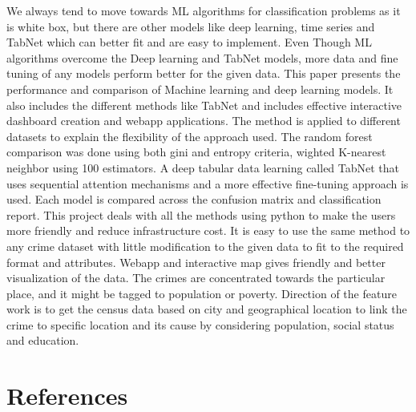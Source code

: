 \documentclass[11 pt,conference,final,]{IEEEtran}
\begin{document}
We always tend to move towards ML algorithms for classification problems
as it is white box, but there are other models like deep learning, time
series and TabNet which can better fit and are easy to implement. Even
Though ML algorithms overcome the Deep learning and TabNet models, more
data and fine tuning of any models perform better for the given data.
This paper presents the performance and comparison of Machine learning
and deep learning models. It also includes the different methods like
TabNet and includes effective interactive dashboard creation and webapp
applications. The method is applied to different datasets to explain the
flexibility of the approach used. The random forest comparison was done
using both gini and entropy criteria, wighted K-nearest neighbor using
100 estimators. A deep tabular data learning called TabNet that uses
sequential attention mechanisms and a more effective fine-tuning
approach is used. Each model is compared across the confusion matrix and
classification report. This project deals with all the methods using
python to make the users more friendly and reduce infrastructure cost.
It is easy to use the same method to any crime dataset with little
modification to the given data to fit to the required format and
attributes. Webapp and interactive map gives friendly and better
visualization of the data. The crimes are concentrated towards the
particular place, and it might be tagged to population or poverty.
Direction of the feature work is to get the census data based on city
and geographical location to link the crime to specific location and its
cause by considering population, social status and education.

\section*{References}\label{references}
\end{document}

